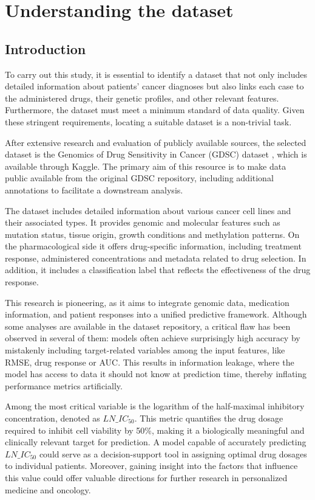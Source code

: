 \chapter{Understanding the dataset}\label{cap:analisis}


\section{Introduction}

To carry out this study, it is essential to identify a dataset that not only includes detailed information about patients' cancer diagnoses but also links each case to the administered drugs, their genetic profiles, and other relevant features. Furthermore, the dataset must meet a minimum standard of data quality. Given these stringent requirements, locating a suitable dataset is a non-trivial task.

After extensive research and evaluation of publicly available sources, the selected dataset is the Genomics of Drug Sensitivity in Cancer (GDSC) dataset \cite{gdsc_kaggle}, which is available through Kaggle. The primary aim of this resource is to make data public available from the original GDSC repository, including additional annotations to facilitate a downstream analysis.

The dataset includes detailed information about various cancer cell lines and their associated types. It provides genomic and molecular features such as mutation status, tissue origin, growth conditions and methylation patterns. On the pharmacological side it offers drug-specific information, including treatment response, administered concentrations and metadata related to drug selection. In addition, it includes a classification label that reflects the effectiveness of the drug response.

This research is pioneering, as it aims to integrate genomic data, medication information, and patient responses into a unified predictive framework. Although some analyses are available in the dataset repository, a critical flaw has been observed in several of them: models often achieve surprisingly high accuracy by mistakenly including target-related variables among the input features, like RMSE, drug response or AUC. This results in information leakage, where the model has access to data it should not know at prediction time, thereby inflating performance metrics artificially.

Among the most critical variable is the logarithm of the half-maximal inhibitory concentration, denoted as \(LN\_IC_{50}\). This metric quantifies the drug dosage required to inhibit cell viability by 50\%, making it a biologically meaningful and clinically relevant target for prediction. A model capable of accurately predicting \(LN\_IC_{50}\) could serve as a decision-support tool in assigning optimal drug dosages to individual patients. Moreover, gaining insight into the factors that influence this value could offer valuable directions for further research in personalized medicine and oncology.

